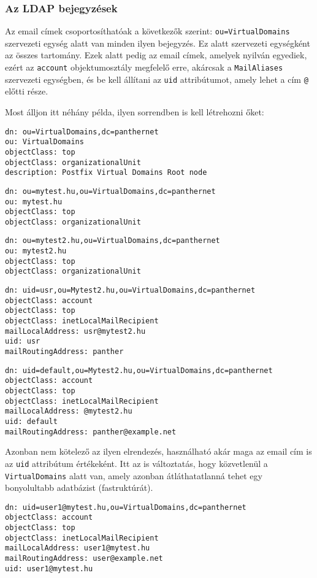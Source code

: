 \subsubsection{Az LDAP bejegyzések}

Az email címek csoportosíthatóak a következők szerint: \texttt{ou=VirtualDomains} szervezeti egység alatt van minden
ilyen bejegyzés. Ez alatt szervezeti egységként az összes tartomány. Ezek alatt pedig az email címek, amelyek nyilván
egyediek, ezért az \texttt{account} objektumosztály megfelelő erre, akárcsak a \texttt{MailAliases} szervezeti
egységben, és be kell állítani az \texttt{uid} attribútumot, amely lehet a cím \texttt{@} előtti része.

Most álljon itt néhány példa, ilyen sorrendben is kell létrehozni őket:

\begin{Verbatim}[frame=single,label=VirtualDomains]
dn: ou=VirtualDomains,dc=panthernet
ou: VirtualDomains
objectClass: top
objectClass: organizationalUnit
description: Postfix Virtual Domains Root node
\end{Verbatim}


\begin{Verbatim}[frame=single,label=mytest.hu]
dn: ou=mytest.hu,ou=VirtualDomains,dc=panthernet
ou: mytest.hu
objectClass: top
objectClass: organizationalUnit
\end{Verbatim}


\begin{Verbatim}[frame=single]
dn: ou=mytest2.hu,ou=VirtualDomains,dc=panthernet
ou: mytest2.hu
objectClass: top
objectClass: organizationalUnit

\end{Verbatim}

\begin{Verbatim}[frame=single]
dn: uid=usr,ou=Mytest2.hu,ou=VirtualDomains,dc=panthernet
objectClass: account
objectClass: top
objectClass: inetLocalMailRecipient
mailLocalAddress: usr@mytest2.hu
uid: usr
mailRoutingAddress: panther
\end{Verbatim}


\begin{Verbatim}[frame=single,label=default]
dn: uid=default,ou=Mytest2.hu,ou=VirtualDomains,dc=panthernet
objectClass: account
objectClass: top
objectClass: inetLocalMailRecipient
mailLocalAddress: @mytest2.hu
uid: default
mailRoutingAddress: panther@example.net
\end{Verbatim}

Azonban nem kötelező az ilyen elrendezés, használható akár maga az email cím is az \texttt{uid} attribútum
értékeként. Itt az is változtatás, hogy közvetlenül a \texttt{VirtualDomains} alatt van, amely azonban átláthatatlanná
tehet egy bonyolultabb adatbázist (fastruktúrát).

\begin{Verbatim}[frame=single,label=user1@mytest.hu]
dn: uid=user1@mytest.hu,ou=VirtualDomains,dc=panthernet
objectClass: account
objectClass: top
objectClass: inetLocalMailRecipient
mailLocalAddress: user1@mytest.hu
mailRoutingAddress: user@example.net
uid: user1@mytest.hu
\end{Verbatim}

